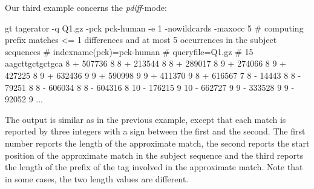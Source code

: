 \documentclass[12pt]{article}
\begin{document}
Our third example concerns the \textit{pdiff}-mode:

\begin{Output}
gt tagerator -q Q1.gz -pck pck-human -e 1 -nowildcards -maxocc 5
# computing prefix matches <= 1 differences and at most 5 occurrences in the subject sequences
# indexname(pck)=pck-human
# queryfile=Q1.gz
# 15 aagcttgctgctgca
8 + 507736 8
8 + 213544 8
8 + 289017 8
9 + 274066 8
9 + 427225 8
9 + 632436 9
9 + 590998 9
9 + 411370 9
8 + 616567 7
8 - 14443 8
8 - 79251 8
8 - 606034 8
8 - 604316 8
10 - 176215 9
10 - 662727 9
9 - 333528 9
9 - 92052 9
...
\end{Output}

The output is similar as in the previous example, except that each match
is reported by three integers with a sign between the first and the
second. The first number reports the length of the
approximate match, the second reports the start position of the approximate
match in the subject sequence and the third reports the length of the prefix 
of the tag involved in the approximate match. Note that in some cases,
the two length values are different.
\end{document}
